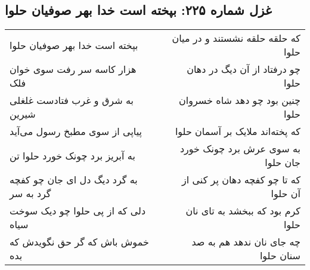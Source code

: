 \begin{center}
\section*{غزل شماره ۲۲۵: بپخته است خدا بهر صوفیان حلوا}
\label{sec:0225}
\begin{longtable}{l p{0.5cm} r}
بپخته است خدا بهر صوفیان حلوا
&&
که حلقه حلقه نشستند و در میان حلوا
\\
هزار کاسه سر رفت سوی خوان فلک
&&
چو درفتاد از آن دیگ در دهان حلوا
\\
به شرق و غرب فتادست غلغلی شیرین
&&
چنین بود چو دهد شاه خسروان حلوا
\\
پیاپی از سوی مطبخ رسول می‌آید
&&
که پخته‌اند ملایک بر آسمان حلوا
\\
به آبریز برد چونک خورد حلوا تن
&&
به سوی عرش برد چونک خورد جان حلوا
\\
به گرد دیگ دل ای جان چو کفچه گرد به سر
&&
که تا چو کفچه دهان پر کنی از آن حلوا
\\
دلی که از پی حلوا چو دیک سوخت سیاه
&&
کرم بود که ببخشد به تای نان حلوا
\\
خموش باش که گر حق نگویدش که بده
&&
چه جای نان ندهد هم به صد سنان حلوا
\\
\end{longtable}
\end{center}
